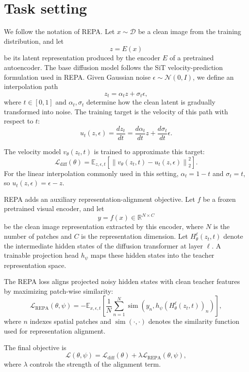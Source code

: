 \section{Task setting}
\label{sec:task_setting}

We follow the notation of REPA. Let $x \sim \mathcal{D}$ be a clean image from the training distribution, and let
\[
z = E(x)
\]
be its latent representation produced by the encoder $E$ of a pretrained autoencoder. The base diffusion model follows the SiT velocity-prediction formulation used in REPA. Given Gaussian noise $\epsilon \sim \mathcal{N}(0,I)$, we define an interpolation path
\[
z_t = \alpha_t z + \sigma_t \epsilon ,
\]
where $t \in [0,1]$ and $\alpha_t,\sigma_t$ determine how the clean latent is gradually transformed into noise. The training target is the velocity of this path with respect to $t$:
\[
u_t(z,\epsilon)
=
\frac{d z_t}{dt}
=
\frac{d\alpha_t}{dt} z
+
\frac{d\sigma_t}{dt} \epsilon .
\]

The velocity model $v_\theta(z_t,t)$ is trained to approximate this target:
\[
\mathcal{L}_{\mathrm{diff}}(\theta)
=
\mathbb{E}_{z,\epsilon,t}
\left[
\left\|
v_\theta(z_t,t) - u_t(z,\epsilon)
\right\|_2^2
\right].
\]
For the linear interpolation commonly used in this setting, $\alpha_t=1-t$ and $\sigma_t=t$, so $u_t(z,\epsilon)=\epsilon-z$.

REPA adds an auxiliary representation-alignment objective. Let $f$ be a frozen pretrained visual encoder, and let
\[
y = f(x) \in \mathbb{R}^{N \times C}
\]
be the clean image representation extracted by this encoder, where $N$ is the number of patches and $C$ is the representation dimension. Let $H_\theta^\ell(z_t,t)$ denote the intermediate hidden states of the diffusion transformer at layer $\ell$. A trainable projection head $h_\psi$ maps these hidden states into the teacher representation space.

The REPA loss aligns projected noisy hidden states with clean teacher features by maximizing patch-wise similarity:
\[
\mathcal{L}_{\mathrm{REPA}}(\theta,\psi)
=
-
\mathbb{E}_{x,\epsilon,t}
\left[
\frac{1}{N}
\sum_{n=1}^{N}
\operatorname{sim}
\left(
y_n,
h_\psi(H_\theta^\ell(z_t,t))_n
\right)
\right],
\]
where $n$ indexes spatial patches and $\operatorname{sim}(\cdot,\cdot)$ denotes the similarity function used for representation alignment.

The final objective is
\[
\mathcal{L}(\theta,\psi)
=
\mathcal{L}_{\mathrm{diff}}(\theta)
+
\lambda
\mathcal{L}_{\mathrm{REPA}}(\theta,\psi),
\]
where $\lambda$ controls the strength of the alignment term.

